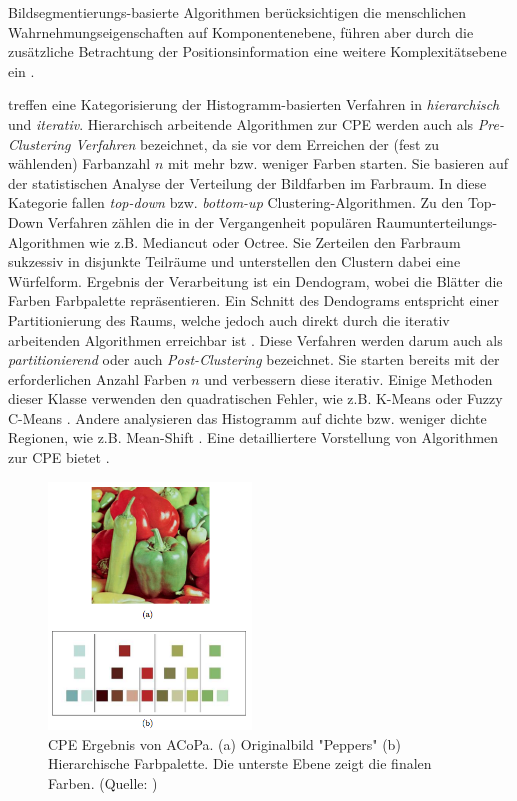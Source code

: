 \documentclass[11pt,a4paper,bibliography=totoc,twocolumn]{scrartcl}
\begin{document}
Bildsegmentierungs-basierte Algorithmen berücksichtigen die menschlichen Wahrnehmungseigenschaften auf Komponentenebene, führen aber durch die zusätzliche Betrachtung der Positionsinformation eine weitere Komplexitätsebene ein \citep{colorthemes}.

\citet{categorization} treffen eine Kategorisierung der Histogramm-basierten Verfahren in \emph{hierarchisch} und \emph{iterativ}. Hierarchisch arbeitende Algorithmen zur CPE werden auch als \emph{Pre-Clustering Verfahren} bezeichnet, da sie vor dem Erreichen der (fest zu wählenden) Farbanzahl $n$ mit mehr bzw. weniger Farben starten. Sie basieren auf der statistischen Analyse der Verteilung der Bildfarben im Farbraum. In diese Kategorie fallen \emph{top-down} bzw. \emph{bottom-up} Clustering-Algorithmen. Zu den Top-Down Verfahren zählen die in der Vergangenheit populären Raumunterteilungs-Algorithmen wie z.B. Mediancut \citep{mediancut} oder Octree\citep{octree}. Sie Zerteilen den Farbraum sukzessiv in disjunkte Teilräume und unterstellen den Clustern dabei eine Würfelform. Ergebnis der Verarbeitung ist ein Dendogram, wobei die Blätter die Farben Farbpalette repräsentieren. Ein Schnitt des Dendograms entspricht einer Partitionierung des Raums, welche jedoch auch direkt durch die iterativ arbeitenden Algorithmen erreichbar ist \citep{acopa}. Diese Verfahren werden darum auch als \emph{partitionierend} \citep{acopa} oder auch \emph{Post-Clustering} \citep{categorization} bezeichnet. Sie starten bereits mit der erforderlichen Anzahl Farben $n$ und verbessern diese iterativ. Einige Methoden dieser Klasse verwenden den quadratischen Fehler, wie z.B. K-Means \citep{kmeans, kmeanshsi} oder Fuzzy C-Means \citep{fuccycmeans}. Andere analysieren das Histogramm auf dichte bzw. weniger dichte Regionen, wie z.B. Mean-Shift \citep{meanshift}. Eine detailliertere Vorstellung von Algorithmen zur CPE bietet \citep{categorization2}.

\begin{figure}[h]
\centering
\includegraphics[width=0.48\textwidth]{img/peppers.png}
\caption{CPE Ergebnis von ACoPa. (a) Originalbild "Peppers" (b) Hierarchische Farbpalette. Die unterste Ebene zeigt die finalen Farben. (Quelle: \citep{acopa})}
\label{fig:peppers}
\end{figure}
\end{document}
